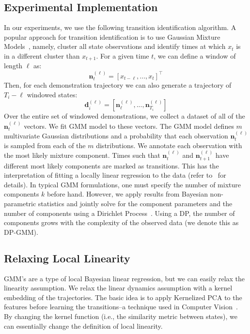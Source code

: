 \subsection{Experimental Implementation}
In our experiments, we use the following transition identification algorithm.
A popular approach for transition identification is to use Gaussian Mixture Models~\cite{calinon2014skills}, namely, cluster all state observations and identify times at which $x_t$ is in a different cluster than $x_{t+1}$.
For a given time $t$, we can define a window of length $\ell$ as:
\[
\mathbf{n}^{(\ell)}_t = [x_{t-\ell},...,x_{t}]^\intercal
\]
Then, for each demonstration trajectory we can also generate a trajectory of $T_i - \ell$ windowed states:
\[
\mathbf{d}^{(\ell)}_i = [\mathbf{n}^{(\ell)}_\ell,...,\mathbf{n}^{(\ell)}_{T_i}]
\]
Over the entire set of windowed demonstrations, we collect a dataset of all of the $\mathbf{n}^{(\ell)}_t$ vectors.
We fit GMM model to these vectors.
The GMM model defines $m$ multivariate Gaussian distributions and a probability that each observation $\mathbf{n}^{(\ell)}_t$ is sampled from each of the $m$ distributions.
We annotate each observation with the most likely mixture component.
Times such that $\mathbf{n}^{(\ell)}_t$ and $\mathbf{n}^{(\ell)}_{t+1}$ have different most likely components are marked as transitions.
This has the interpretation of fitting a locally linear regression to the data (refer to~\cite{moldovan2013dirichlet, khansari2011learning, kruger2010learning, krishnan2015tsc,murali2016} for details).
In typical GMM formulations, one must specify the number of mixture components $k$ before hand.
However, we apply results from Bayesian non-parametric statistics and jointly solve for the component parameters and the number of components using a Dirichlet Process~\cite{kulis2011revisiting}.
Using a DP, the number of components grows with the complexity of the observed data (we denote this as DP-GMM).


\subsection{Relaxing Local Linearity}
GMM's are a type of local Bayesian linear regression, but we can easily relax the linearity assumption.
We relax the linear dynamics assumption with a kernel embedding of the trajectories.
The basic idea is to apply Kernelized PCA to the features before learning the transitions--a technique used in Computer Vision~\cite{DBLP:conf/nips/MikaSSMSR98}.
By changing the kernel function (i.e., the similarity metric between states), we can essentially change the definition of local linearity.

